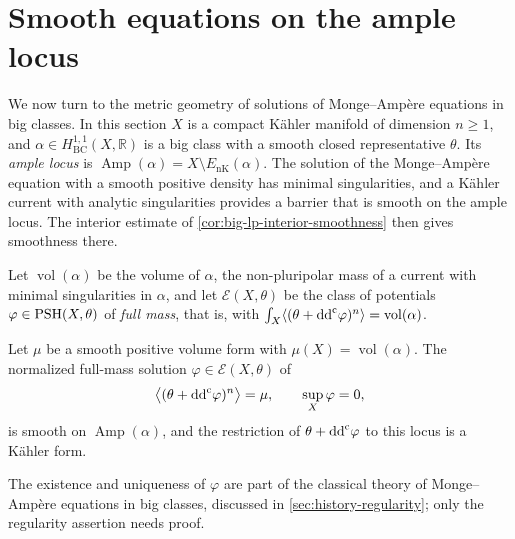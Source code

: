 \section{Smooth equations on the ample locus}
\label{sec:ample-locus-smoothness}

We now turn to the metric geometry of solutions of Monge--Amp\`ere equations in big classes. In this section $X$ is a compact K\"ahler manifold of dimension $n\geq1$, and $\alpha\in H^{1,1}_{\mathrm{BC}}(X,\mathbb R)$ is a big class with a smooth closed representative $\theta$. Its \emph{ample locus} is $\operatorname{Amp}(\alpha)=X\setminus E_{\mathrm{nK}}(\alpha)$. The solution of the Monge--Amp\`ere equation with a smooth positive density has minimal singularities, and a K\"ahler current with analytic singularities provides a barrier that is smooth on the ample locus. The interior estimate of \cref{cor:big-lp-interior-smoothness} then gives smoothness there.

Let $\operatorname{vol}(\alpha)$ be the volume of $\alpha$, the non-pluripolar mass of a current with minimal singularities in $\alpha$, and let $\mathcal E(X,\theta)$ be the class of potentials $\varphi\in\mathrm{PSH}(X,\theta)$ of \emph{full mass}, that is, with $\int_X\langle(\theta+\mathrm{dd}^{\mathrm{c}}\varphi)^n\rangle=\operatorname{vol}(\alpha)$.

\begin{theorem}\label{thm:big-class-ample-smoothness}
Let $\mu$ be a smooth positive volume form with
$\mu(X)=\operatorname{vol}(\alpha)$. The normalized full-mass solution
$\varphi\in\mathcal E(X,\theta)$ of
\begin{equation}\label{eq:big-class-smooth-volume}
 \bigl\langle(\theta+\mathrm{dd}^{\mathrm{c}}\varphi)^n\bigr\rangle=\mu,
 \qquad \sup_X\varphi=0,
\end{equation}
is smooth on $\operatorname{Amp}(\alpha)$, and the restriction of
$\theta+\mathrm{dd}^{\mathrm{c}}\varphi$ to this locus is a K\"ahler form.
\end{theorem}

The existence and uniqueness of $\varphi$ are part of the classical theory of Monge--Amp\`ere equations in big classes, discussed in \cref{sec:history-regularity}; only the regularity assertion needs proof.


